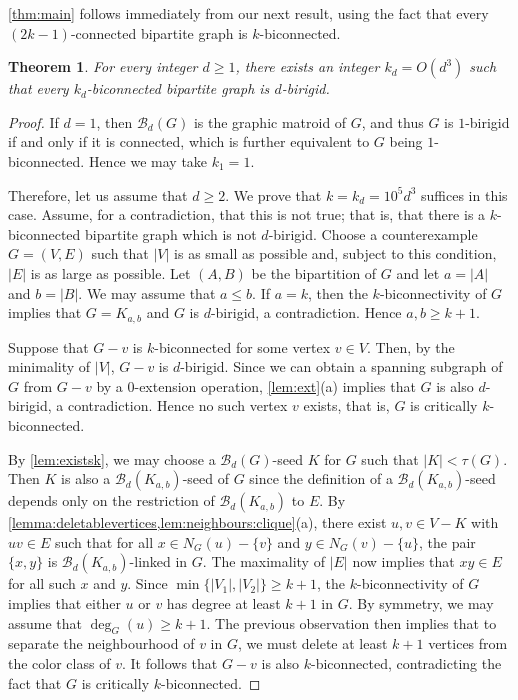 \documentclass[11pt,a4paper,dvipsnames]{scrartcl}
\newtheorem{theorem}{Theorem}[section]
\newcommand{\cB}{{\mathcal{B}}}
\newcommand{\birigid}[1]{$#1$-birigid}
\begin{document}
\cref{thm:main}  follows immediately from our next result, using the fact that every $(2k-1)$-connected bipartite graph is $k$-biconnected.

\begin{theorem}\label{thm:bicon} For every integer $d\geq 1$, there exists an integer $k_d = O(d^3)$ such that every $k_d$-biconnected bipartite graph  is \birigid{d}.
\end{theorem}
\begin{proof}

If $d=1$, then $\cB_d(G)$ is the graphic matroid of $G$, and thus $G$ is $1$-birigid if and only if it is connected, which is further equivalent to $G$ being $1$-biconnected. Hence we may take $k_1 = 1$.

Therefore, let us assume that $d \geq 2$.
We prove that $ k = k_d = 10^5d^3$ suffices in this case. Assume, for a contradiction, that this is not true; that is, that there is a $k$-biconnected bipartite graph which is not \birigid{d}.
    Choose a counterexample $G=(V,E)$ such that $|V|$ is as small as possible and, subject to this condition,  $|E|$ is as large as possible. Let $(A,B)$ be the bipartition of $G$ and let $a=|A|$ and $b = |B|$. We may assume that $a \leq b$. If $a=k$, then the $k$-biconnectivity of $G$ implies that $G=K_{a,b}$ 
    and $G$ is \birigid{d}, a contradiction. Hence $a,b\geq k+1$.
    
    Suppose that $G-v$ is $k$-biconnected for some vertex $v\in V$. Then, by the minimality of $|V|$, $G-v$ is \birigid{d}.  Since we can obtain a spanning subgraph of $G$ from $G-v$ by a 0-extension operation, \cref{lem:ext}(a) implies that $G$ is also \birigid{d}, a contradiction.
    Hence no such vertex $v$ exists, that is, $G$ is critically $k$-biconnected. 

By \cref{lem:existsk}, we may choose  
    a $\cB_{d}(G)$-seed $K$ for $G$ such that $|K|< \tau (G)$. Then $K$ is also a $\cB_{d}(K_{a,b})$-seed of $G$ since the definition of a $\cB_{d}(K_{a,b})$-seed depends only on the restriction of $\cB_{d}(K_{a,b})$ to $E$. By \cref{lemma:deletablevertices,lem:neighbours:clique}(a), there exist $u,v\in V-K$ with $uv\in E$ such that
    for all $x\in N_G(u)-\{v\}$ and  $y\in N_G(v)-\{u\}$, the pair $\{x,y\}$ is $\cB_{d}(K_{a,b})$-linked in $G$. The maximality of $|E|$ now implies that $xy\in E$ for all such $x$ and $y$.
    Since $\min\{|V_1|,|V_2|\}\geq k+1$, the $k$-biconnectivity of $G$ implies that either $u$ or $v$ has degree at least $k+1$ in $G$.
    By symmetry, we may assume that $\deg_G(u)\geq k+1$. The previous observation then implies that to separate the neighbourhood of $v$ in $G$, we must delete at least $k+1$ vertices from the color class of $v$. It follows that $G-v$ is also $k$-biconnected, contradicting the fact that $G$ is critically $k$-biconnected.
\end{proof}
\end{document}
